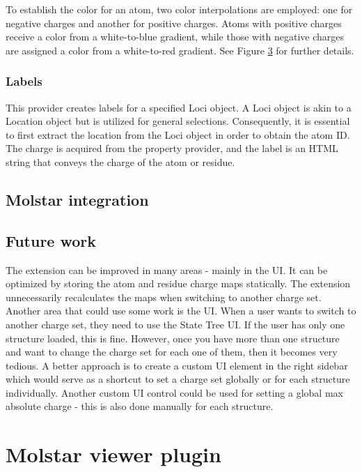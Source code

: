 \documentclass[
  digital,     %
  oneside,     %
  nosansbold,  %
  nocolorbold, %
  lof,         %
  lot,         %
]{fithesis4}
\begin{document}
To establish the color for an atom, two color interpolations are employed: one for negative charges and another for positive charges. Atoms with positive charges receive a color from a white-to-blue gradient, while those with negative charges are assigned a color from a white-to-red gradient. See Figure \ref{} for further details.

\subsection{Labels}

This provider creates labels for a specified Loci object. A Loci object is akin to a Location object but is utilized for general selections. Consequently, it is essential to first extract the location from the Loci object in order to obtain the atom ID. The charge is acquired from the property provider, and the label is an HTML string that conveys the charge of the atom or residue.

\section{Molstar integration}

\section{Future work}

The extension can be improved in many areas - mainly in the UI. It can be optimized by storing the atom and residue charge maps statically. The extension unnecessarily recalculates the maps when switching to another charge set. Another area that could use some work is the UI. When a user wants to switch to another charge set, they need to use the State Tree UI. If the user has only one structure loaded, this is fine. However, once you have more than one structure and want to change the charge set for each one of them, then it becomes very tedious. A better approach is to create a custom UI element in the right sidebar which would serve as a shortcut to set a charge set globally or for each structure individually. Another custom UI control could be used for setting a global max absolute charge - this is also done manually for each structure.

\chapter{Molstar viewer plugin}
\end{document}
